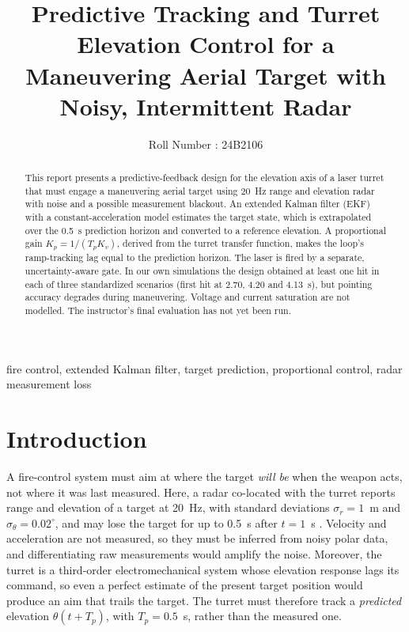 \documentclass[conference]{IEEEtran}
\newcommand{\Tp}{T_p}
\newcommand{\Kp}{K_p}
\newcommand{\Kv}{K_v}
\begin{document}
\title{Predictive Tracking and Turret Elevation Control for a Maneuvering Aerial Target with Noisy, Intermittent Radar}

\author{
    Roll Number : 24B2106
}

\maketitle

\begin{abstract}
This report presents a predictive-feedback design for the elevation axis of a laser turret that must engage a maneuvering aerial target using 20~Hz range and elevation radar with noise and a possible measurement blackout. An extended Kalman filter (EKF) with a constant-acceleration model estimates the target state, which is extrapolated over the 0.5~s prediction horizon and converted to a reference elevation. A proportional gain $\Kp = 1/(\Tp \Kv)$, derived from the turret transfer function, makes the loop's ramp-tracking lag equal to the prediction horizon. The laser is fired by a separate, uncertainty-aware gate. In our own simulations the design obtained at least one hit in each of three standardized scenarios (first hit at 2.70, 4.20 and 4.13~s), but pointing accuracy degrades during maneuvering. Voltage and current saturation are not modelled. The instructor's final evaluation has not yet been run.
\end{abstract}

\begin{IEEEkeywords}
fire control, extended Kalman filter, target prediction, proportional control, radar measurement loss
\end{IEEEkeywords}

\section{Introduction}

A fire-control system must aim at where the target \emph{will be} when the weapon acts, not where it was last measured. Here, a radar co-located with the turret reports range and elevation of a target at 20~Hz, with standard deviations $\sigma_r = 1$~m and $\sigma_\theta = 0.02^\circ$, and may lose the target for up to 0.5~s after $t = 1$~s \cite{assign}. Velocity and acceleration are not measured, so they must be inferred from noisy polar data, and differentiating raw measurements would amplify the noise. Moreover, the turret is a third-order electromechanical system whose elevation response lags its command, so even a perfect estimate of the present target position would produce an aim that trails the target. The turret must therefore track a \emph{predicted} elevation $\theta(t+\Tp)$, with $\Tp = 0.5$~s, rather than the measured one.
\end{document}
